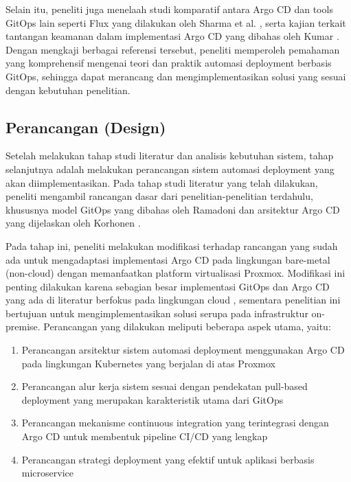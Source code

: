 Selain itu, peneliti juga menelaah studi komparatif antara Argo CD dan tools
GitOps lain seperti Flux yang dilakukan oleh Sharma et al. \cite{Sharma2022},
serta kajian terkait tantangan keamanan dalam implementasi Argo CD yang dibahas
oleh Kumar \cite{Kumar2023}. Dengan mengkaji berbagai referensi tersebut,
peneliti memperoleh pemahaman yang komprehensif mengenai teori dan praktik
automasi deployment berbasis GitOps, sehingga dapat merancang dan
mengimplementasikan solusi yang sesuai dengan kebutuhan penelitian.

\subsection{Perancangan (Design)}
Setelah melakukan tahap studi literatur dan analisis kebutuhan sistem, tahap
selanjutnya adalah melakukan perancangan sistem automasi deployment yang akan
diimplementasikan. Pada tahap studi literatur yang telah dilakukan, peneliti
mengambil rancangan dasar dari penelitian-penelitian terdahulu, khususnya model
GitOps yang dibahas oleh Ramadoni \cite{Ramadoni2021} dan arsitektur Argo CD
yang dijelaskan oleh Korhonen \cite{Korhonen2021}.

Pada tahap ini, peneliti melakukan modifikasi terhadap rancangan yang sudah ada
untuk mengadaptasi implementasi Argo CD pada lingkungan bare-metal (non-cloud)
dengan memanfaatkan platform virtualisasi Proxmox. Modifikasi ini penting
dilakukan karena sebagian besar implementasi GitOps dan Argo CD yang ada di
literatur berfokus pada lingkungan cloud \cite{Bolscher2019}, sementara
penelitian ini bertujuan untuk mengimplementasikan solusi serupa pada
infrastruktur on-premise. Perancangan yang dilakukan meliputi beberapa aspek
utama, yaitu:

\begin{enumerate}
  \item Perancangan arsitektur sistem automasi deployment menggunakan Argo CD pada
        lingkungan Kubernetes yang berjalan di atas Proxmox
  \item Perancangan alur kerja sistem sesuai dengan pendekatan pull-based deployment
        yang merupakan karakteristik utama dari GitOps \cite{Weaveworks2017}
  \item Perancangan mekanisme continuous integration yang terintegrasi dengan Argo CD
        untuk membentuk pipeline CI/CD yang lengkap
  \item Perancangan strategi deployment yang efektif untuk aplikasi berbasis
        microservice
\end{enumerate}

